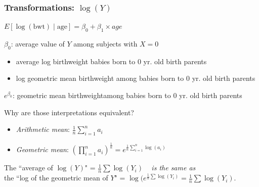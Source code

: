 \documentclass[10pt,t]{beamer}
\begin{document}
\begin{frame}
\frametitle{Transformations: $\log(Y)$}
\begin{center} $E[\log(\text{bwt}) \mid \text{age}] = \beta_0 + \beta_1 \times age$ \end{center}
$\beta_0$: average value of $Y$ among subjects with $X = 0$\\ \pause
\begin{itemize}
	\item[] average log birthweight babies born to 0 yr. old birth parents  \pause
	\item[] log geometric mean birthweight among babies born to 0 yr. old birth parents \pause
\end{itemize}
\color{blue} $e^{\beta_0}$: geometric mean birthweightamong babies born to 0 yr. old birth parents \color{black}\pause

\vspace{0.3cm}

Why are those interpretations equivalent?
\begin{itemize}
	\item[] \textit{Arithmetic mean}: $\frac{1}{n} \sum_{i=1}^n a_i$
	\item[] \textit{Geometric mean}: $\left(\prod_{i=1}^n a_i\right)^{\frac{1}{n}} = e^{\frac{1}{n} \sum_{i=1}^n \log(a_i)}$
\end{itemize}

\vspace{0.3cm}

\begin{footnotesize}The \color{blue} ``average of $\log(Y)$" \color{black} = $\frac{1}{n}\sum \log(Y_i)$ \ \color{blue} \textit{is the same as} \color{black}\\the \color{blue}``log of the geometric mean of $Y$" \color{black}= $\log(e^{\frac{1}{n}\sum \log(Y_i)} = \frac{1}{n}\sum \log(Y_i)$.\end{footnotesize}
\end{frame}
\end{document}
